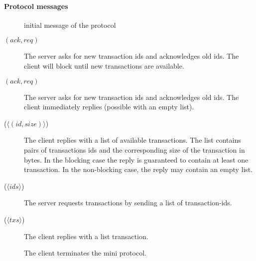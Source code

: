 \paragraph{Protocol messages}
\begin{description}
\item [\MsgInit] initial message of the protocol
\item [\MsgRequestTxIdsB{} {\boldmath $(ack,req)$}]
      The server asks for new transaction ids and acknowledges old ids.
      The client will block until new transactions are available.
\item [\MsgRequestTxIdsNB{} {\boldmath $(ack,req)$}]
      The server asks for new transaction ids and acknowledges old ids.
      The client immediately replies (possible with an empty list).
\item [\MsgReplyTxIds{} {\boldmath ($\langle (id, size) \rangle$) }]
      The client replies with a list of available transactions.
      The list contains pairs of transactions ids and the corresponding size of the transaction in bytes.
      In the blocking case the reply is guaranteed to contain at least one transaction.
      In the non-blocking case, the reply may contain an empty list.
\item [\MsgRequestTxs{} {\boldmath ($\langle ids \rangle$)}]
      The server requests transactions by sending a list of transaction-ids.
\item [\MsgReplyTxs{} {\boldmath ($\langle txs \rangle$})]
      The client replies with a list transaction.
\item [\MsgDone]
      The client terminates the mini protocol.
\end{description}

